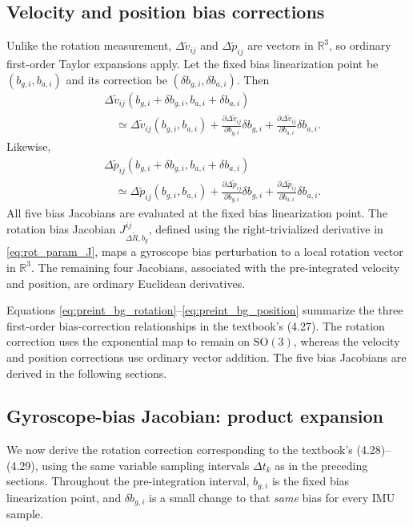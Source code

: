 \documentclass[11pt,a4paper]{article}
\newcommand{\SO}{\mathrm{SO}}
\newcommand{\R}{\mathbb{R}}
\begin{document}
\subsection{Velocity and position bias corrections}
Unlike the rotation measurement, $\Delta\tilde v_{ij}$ and
$\Delta\tilde p_{ij}$ are vectors in $\R^3$, so ordinary first-order
Taylor expansions apply. Let the fixed bias linearization point be
$(b_{g,i},b_{a,i})$ and its correction be
$(\delta b_{g,i},\delta b_{a,i})$. Then
\begin{equation}\label{eq:preint_bg_velocity}
\boxed{\begin{aligned}
&\Delta\tilde v_{ij}(b_{g,i}+\delta b_{g,i},
 b_{a,i}+\delta b_{a,i})\\
&\quad\simeq\Delta\tilde v_{ij}(b_{g,i},b_{a,i})
+\frac{\partial\Delta\tilde v_{ij}}{\partial b_{g,i}}\delta b_{g,i}
+\frac{\partial\Delta\tilde v_{ij}}{\partial b_{a,i}}\delta b_{a,i}.
\end{aligned}}
\end{equation}
Likewise,
\begin{equation}\label{eq:preint_bg_position}
\boxed{\begin{aligned}
&\Delta\tilde p_{ij}(b_{g,i}+\delta b_{g,i},
 b_{a,i}+\delta b_{a,i})\\
&\quad\simeq\Delta\tilde p_{ij}(b_{g,i},b_{a,i})
+\frac{\partial\Delta\tilde p_{ij}}{\partial b_{g,i}}\delta b_{g,i}
+\frac{\partial\Delta\tilde p_{ij}}{\partial b_{a,i}}\delta b_{a,i}.
\end{aligned}}
\end{equation}
All five bias Jacobians are evaluated at the fixed bias linearization
point. The rotation bias Jacobian $J_{\Delta\tilde R,b_g}^{ij}$,
defined using the right-trivialized derivative in
\eqref{eq:rot_param_J}, maps a gyroscope bias perturbation to a local
rotation vector in $\R^3$. The remaining four Jacobians, associated
with the pre-integrated velocity and position, are ordinary Euclidean
derivatives.

Equations \eqref{eq:preint_bg_rotation}--\eqref{eq:preint_bg_position}
summarize the three first-order bias-correction relationships in the
textbook's (4.27). The rotation correction uses the exponential map to
remain on $\SO(3)$, whereas the velocity and position corrections use
ordinary vector addition. The five bias Jacobians are derived in the
following sections.

\subsection{Gyroscope-bias Jacobian: product expansion}
We now derive the rotation correction corresponding to the textbook's
(4.28)--(4.29), using the same variable sampling intervals $\Delta t_k$
as in the preceding sections. Throughout the pre-integration interval,
$b_{g,i}$ is the fixed bias linearization point, and $\delta b_{g,i}$
is a small change to that \emph{same} bias for every IMU sample.
\end{document}

